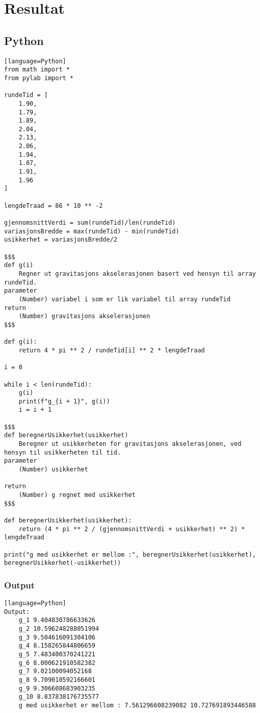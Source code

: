 \documentclass[a4paper]{article}
\begin{document}
\section{Resultat} %
\label{sec:resultat}
\subsection{Python} %
\label{sub:python}



\begin{lstlisting}[frame=single][language=Python]
from math import *
from pylab import *

rundeTid = [
    1.90,
    1.79,
    1.89,
    2.04,
    2.13,
    2.06,
    1.94,
    1.87,
    1.91,
    1.96
]

lengdeTraad = 86 * 10 ** -2

gjennomsnittVerdi = sum(rundeTid)/len(rundeTid)
variasjonsBredde = max(rundeTid) - min(rundeTid)
usikkerhet = variasjonsBredde/2

$$$
def g(i)
	Regner ut gravitasjons akselerasjonen basert ved hensyn til array rundeTid.
parameter
	(Number) variabel i som er lik variabel til array rundeTid
return 
	(Number) gravitasjons akselerasjonen
$$$

def g(i):
    return 4 * pi ** 2 / rundeTid[i] ** 2 * lengdeTraad

i = 0

while i < len(rundeTid):
    g(i)
    print(f"g_{i + 1}", g(i))
    i = i + 1

$$$
def beregnerUsikkerhet(usikkerhet)
	Beregner ut usikkerheten for gravitasjons akselerasjonen, ved hensyn til usikkerheten til tid.
parameter
	(Number) usikkerhet

return
	(Number) g regnet med usikkerhet 
$$$

def beregnerUsikkerhet(usikkerhet):
    return (4 * pi ** 2 / (gjennomsnittVerdi + usikkerhet) ** 2) * lengdeTraad

print("g med usikkerhet er mellom :", beregnerUsikkerhet(usikkerhet), beregnerUsikkerhet(-usikkerhet))
\end{lstlisting}
\subsubsection{Output} %
\label{ssub:output}
\begin{lstlisting}[frame=single][language=Python]
Output:
	g_1 9.404830786633626
	g_2 10.596248288051994
	g_3 9.504616091304106
	g_4 8.158265844806659
	g_5 7.483400370241221
	g_6 8.000621910582382
	g_7 9.02100094052168
	g_8 9.709010592166601
	g_9 9.306608683903235
	g_10 8.837838176735577
	g med usikkerhet er mellom : 7.561296608239082 10.727691893446588
\end{lstlisting}
\end{document}
